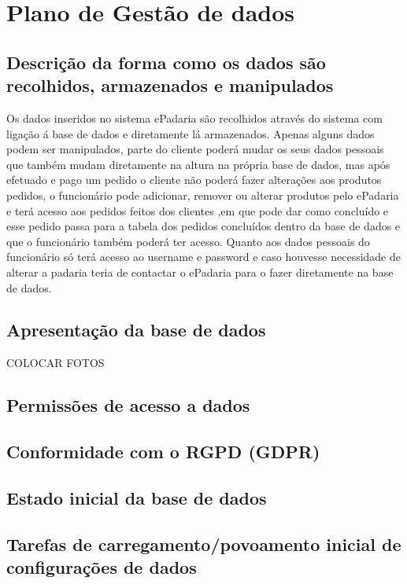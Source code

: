 \chapter{Plano de Gestão de dados}
\label{plano_de_gestao_de_dados}
\section{Descrição da forma como os dados são recolhidos, armazenados e manipulados}
Os dados inseridos no sistema ePadaria são recolhidos através do sistema com ligação á base de dados e diretamente lá armazenados. Apenas alguns dados podem ser manipulados, parte do cliente poderá mudar os seus dados pessoais que também mudam diretamente na altura na própria base de dados, mas após efetuado e pago um pedido o cliente não poderá fazer alterações aos produtos pedidos, o funcionário pode adicionar, remover ou alterar produtos pelo ePadaria e terá acesso aos pedidos feitos dos clientes ,em que pode dar como concluído e esse pedido passa para a tabela dos pedidos concluídos dentro da base de dados e que o funcionário também poderá ter acesso. Quanto aos dados pessoais do funcionário só terá acesso ao username e password e caso houvesse necessidade de alterar a padaria teria de contactar o ePadaria para o fazer diretamente na base de dados.
\section{Apresentação da base de dados}
COLOCAR FOTOS
\section{Permissões de acesso a dados}
\section{Conformidade com o RGPD (GDPR)}
\section{Estado inicial da base de dados}
\section{Tarefas de carregamento/povoamento inicial de configurações de dados}

